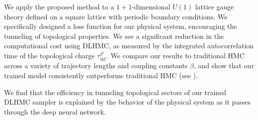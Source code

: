 \documentclass{article} %
\begin{document}
   
We apply the proposed method to a \(1+1\)-dimensional \(U(1)\) lattice gauge theory defined on a
      square lattice with periodic boundary conditions.
We specifically designed a loss function for our physical system,
encouraging the tunneling of topological properties.
      We see a significant reduction in the
      computational cost using DLHMC, as measured by the integrated autocorrelation time of the topological charge
      \(\tau_{\mathrm{int}}^{\mathcal{Q}}\).
      We compare our results to traditional HMC across a variety of trajectory lengths and coupling constants
      \(\beta\), and show that our trained model consistently outperforms traditional HMC (see
      ).

We find that the efficiency in tunneling topological sectors of our trained DLHMC sampler
is explained by the behavior of the physical system as it passes through the deep neural network.
%
\end{document}
